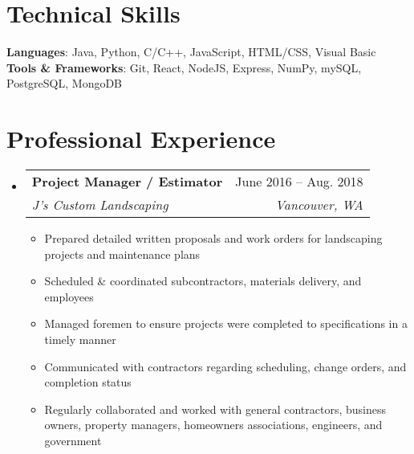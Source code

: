 \documentclass[letterpaper,11pt]{article}
\makeatletter
\newcommand{\resumeItem}[1]{
  \item\small{
    {#1 \vspace{-2pt}}
  }
}
\newcommand{\resumeSubheading}[4]{
  \vspace{-2pt}\item
    \begin{tabular*}{0.97\textwidth}[t]{l@{\extracolsep{\fill}}r}
      \textbf{#1} & #2 \\
      \textit{\small#3} & \textit{\small #4} \\
    \end{tabular*}\vspace{-7pt}
}
\newcommand{\resumeSubHeadingListStart}{\begin{itemize}[leftmargin=0.15in, label={}]}
\newcommand{\resumeSubHeadingListEnd}{\end{itemize}}
\newcommand{\resumeItemListStart}{\begin{itemize}}
\newcommand{\resumeItemListEnd}{\end{itemize}\vspace{-5pt}}
\makeatother
\begin{document}
%
\section{Technical Skills}
 \begin{itemize}[leftmargin=0.15in, label={}]
    \small{\item{
     \textbf{Languages}{: Java, Python, C/C++, JavaScript, HTML/CSS, Visual Basic} \\
     \textbf{Tools \& Frameworks}{: Git, React, NodeJS, Express, NumPy, mySQL, PostgreSQL, MongoDB} \\
    }}
 \end{itemize}
\section{Professional Experience}
  \resumeSubHeadingListStart

    \resumeSubheading
      {Project Manager / Estimator}{June 2016 -- Aug. 2018}
      {J's Custom Landscaping}{Vancouver, WA}
      \resumeItemListStart
        \resumeItem{Prepared detailed written proposals and work orders for landscaping projects and maintenance plans}
        \resumeItem{Scheduled \& coordinated subcontractors, materials delivery, and employees}
        \resumeItem{Managed foremen to ensure projects were completed to specifications in a timely manner}
        \resumeItem{Communicated with contractors regarding scheduling, change orders, and completion status}
        \resumeItem{Regularly collaborated and worked with general contractors, business owners, property managers, homeowners associations, engineers, and government}
      \resumeItemListEnd
      
  \resumeSubHeadingListEnd

\end{document}
